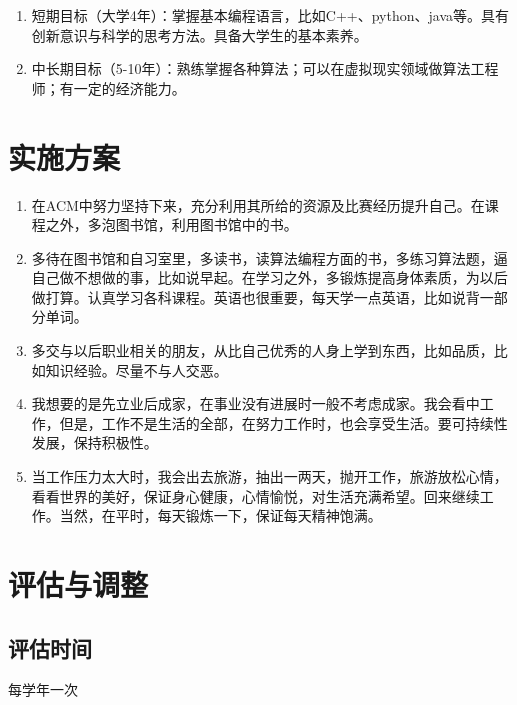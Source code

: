 \documentclass{article}
\begin{document}
\begin{enumerate}[(1)]
	\item 短期目标（大学4年）：掌握基本编程语言，比如C++、python、java等。具有创新意识与科学的思考方法。具备大学生的基本素养。\par
	\item 中长期目标（5-10年）：熟练掌握各种算法；可以在虚拟现实领域做算法工程师；有一定的经济能力。\par
\end{enumerate}


\section{实施方案}
\par
\begin{enumerate}[1、]
	\item 在ACM中努力坚持下来，充分利用其所给的资源及比赛经历提升自己。在课程之外，多泡图书馆，利用图书馆中的书。\par
	\item 多待在图书馆和自习室里，多读书，读算法编程方面的书，多练习算法题，逼自己做不想做的事，比如说早起。在学习之外，多锻炼提高身体素质，为以后做打算。认真学习各科课程。英语也很重要，每天学一点英语，比如说背一部分单词。\par
	\item 多交与以后职业相关的朋友，从比自己优秀的人身上学到东西，比如品质，比如知识经验。尽量不与人交恶。\par
	\item 我想要的是先立业后成家，在事业没有进展时一般不考虑成家。我会看中工作，但是，工作不是生活的全部，在努力工作时，也会享受生活。要可持续性发展，保持积极性。\par
	\item 当工作压力太大时，我会出去旅游，抽出一两天，抛开工作，旅游放松心情，看看世界的美好，保证身心健康，心情愉悦，对生活充满希望。回来继续工作。当然，在平时，每天锻炼一下，保证每天精神饱满。\par
\end{enumerate}
\par 

\section{评估与调整}
\par 

\subsection{评估时间}
每学年一次\par
\end{document}
